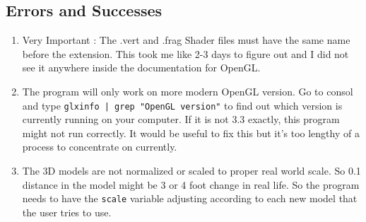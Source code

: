 \documentclass[a4paper,11pt]{article}
\begin{document}
        \subsection{Errors and Successes}
        \begin{enumerate}
        \item Very Important : The .vert and .frag Shader files must have the same name before the extension. This took me like 2-3 days to figure out and I did not see it anywhere inside the documentation for OpenGL.
        \item The program will only work on more modern OpenGL version. Go to consol and type \texttt{glxinfo | grep "OpenGL version"} to find out which version is currently running on your computer. If it is not 3.3 exactly, this program might not run correctly. It would be useful to fix this but it's too lengthy of a process to concentrate on currently.
        \item The 3D models are not normalized or scaled to proper real world scale. So 0.1 distance in the model might be 3 or 4 foot change in real life. So the program needs to have the \texttt{scale} variable adjusting according to each new model that the user tries to use.
        \end{enumerate}
        
\end{document}
